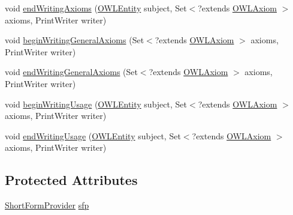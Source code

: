 \begin{DoxyCompactItemize}
\item 
void \hyperlink{classuk_1_1ac_1_1manchester_1_1cs_1_1owlapi_1_1dlsyntax_1_1_d_l_syntax_h_t_m_l_ontology_storer_a7e621fb673c32f0dbe8f23e0400629a5}{end\-Writing\-Axioms} (\hyperlink{interfaceorg_1_1semanticweb_1_1owlapi_1_1model_1_1_o_w_l_entity}{O\-W\-L\-Entity} subject, Set$<$?extends \hyperlink{interfaceorg_1_1semanticweb_1_1owlapi_1_1model_1_1_o_w_l_axiom}{O\-W\-L\-Axiom} $>$ axioms, Print\-Writer writer)
\item 
void \hyperlink{classuk_1_1ac_1_1manchester_1_1cs_1_1owlapi_1_1dlsyntax_1_1_d_l_syntax_h_t_m_l_ontology_storer_a02f7a1cae2eab0d328397aaabc0f8d32}{begin\-Writing\-General\-Axioms} (Set$<$?extends \hyperlink{interfaceorg_1_1semanticweb_1_1owlapi_1_1model_1_1_o_w_l_axiom}{O\-W\-L\-Axiom} $>$ axioms, Print\-Writer writer)
\item 
void \hyperlink{classuk_1_1ac_1_1manchester_1_1cs_1_1owlapi_1_1dlsyntax_1_1_d_l_syntax_h_t_m_l_ontology_storer_a70ee26a54a48e6364e9cff755859b83f}{end\-Writing\-General\-Axioms} (Set$<$?extends \hyperlink{interfaceorg_1_1semanticweb_1_1owlapi_1_1model_1_1_o_w_l_axiom}{O\-W\-L\-Axiom} $>$ axioms, Print\-Writer writer)
\item 
void \hyperlink{classuk_1_1ac_1_1manchester_1_1cs_1_1owlapi_1_1dlsyntax_1_1_d_l_syntax_h_t_m_l_ontology_storer_a5d4368db411446009059fdbbe8877aca}{begin\-Writing\-Usage} (\hyperlink{interfaceorg_1_1semanticweb_1_1owlapi_1_1model_1_1_o_w_l_entity}{O\-W\-L\-Entity} subject, Set$<$?extends \hyperlink{interfaceorg_1_1semanticweb_1_1owlapi_1_1model_1_1_o_w_l_axiom}{O\-W\-L\-Axiom} $>$ axioms, Print\-Writer writer)
\item 
void \hyperlink{classuk_1_1ac_1_1manchester_1_1cs_1_1owlapi_1_1dlsyntax_1_1_d_l_syntax_h_t_m_l_ontology_storer_a5f9569352b81bf1c306deea61c8eba15}{end\-Writing\-Usage} (\hyperlink{interfaceorg_1_1semanticweb_1_1owlapi_1_1model_1_1_o_w_l_entity}{O\-W\-L\-Entity} subject, Set$<$?extends \hyperlink{interfaceorg_1_1semanticweb_1_1owlapi_1_1model_1_1_o_w_l_axiom}{O\-W\-L\-Axiom} $>$ axioms, Print\-Writer writer)
\end{DoxyCompactItemize}
\subsection*{Protected Attributes}
\begin{DoxyCompactItemize}
\item 
\hyperlink{interfaceorg_1_1semanticweb_1_1owlapi_1_1util_1_1_short_form_provider}{Short\-Form\-Provider} \hyperlink{classuk_1_1ac_1_1manchester_1_1cs_1_1owlapi_1_1dlsyntax_1_1_d_l_syntax_h_t_m_l_ontology_storer_a0eac84e7514b63befce37422ce635983}{sfp}
\end{DoxyCompactItemize}
